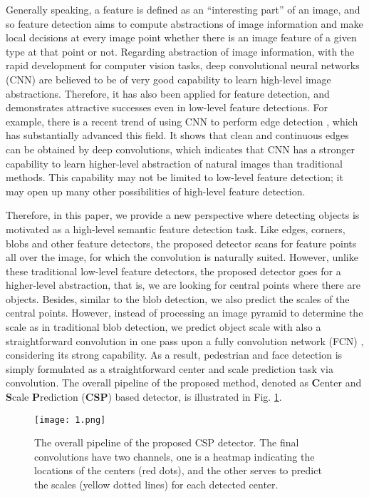 Generally speaking, a feature is defined as an ``interesting part'' of an image, and so feature detection aims to compute abstractions of image information and make local decisions at every image point whether there is an image feature of a given type at that point or not. Regarding abstraction of image information, with the rapid development for computer vision tasks, deep convolutional neural networks (CNN) are believed to be of very good capability to learn high-level image abstractions. Therefore, it has also been applied for feature detection, and demonstrates attractive successes even in low-level feature detections. For example, there is a recent trend of using CNN to perform edge detection \cite{shen2015deepcontour,xie2017holistically,bertasius2015deepedge,liu2017richer}, which has substantially advanced this field. It shows that clean and continuous edges can be obtained by deep convolutions, which indicates that CNN has a stronger capability to learn higher-level abstraction of natural images than traditional methods. This capability may not be limited to low-level feature detection; it may open up many other possibilities of high-level feature detection.

Therefore, in this paper, we provide a new perspective where detecting objects is motivated as a high-level semantic feature detection task. Like edges, corners, blobs and other feature detectors, the proposed detector scans for feature points all over the image, for which the convolution is naturally suited. However, unlike these traditional low-level feature detectors, the proposed detector goes for a higher-level abstraction, that is, we are looking for central points where there are objects. Besides, similar to the blob detection, we also predict the scales of the central points. However, instead of processing an image pyramid to determine the scale as in traditional blob detection, we predict object scale with also a straightforward convolution in one pass upon a fully convolution network (FCN) \cite{long2015fully}, considering its strong capability. As a result, pedestrian and face detection is simply formulated as a straightforward center and scale prediction task via convolution. The overall pipeline of the proposed method, denoted as \textbf{C}enter and \textbf{S}cale \textbf{P}rediction (\textbf{CSP}) based detector, is illustrated in Fig. \ref{fig:pipeline}.

\begin{figure}[t]
\begin{center}
\texttt{[image: 1.png]}
\end{center}
   \caption{The overall pipeline of the proposed CSP detector. The final convolutions have two channels, one is a heatmap indicating the locations of the centers (red dots), and the other serves to predict the scales (yellow dotted lines) for each detected center.}
\label{fig:pipeline}
\end{figure}

